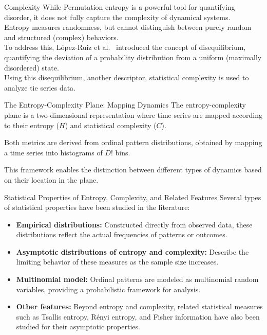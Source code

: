 \documentclass{beamer}
\begin{document}
\begin{frame}{Complexity}
	While Permutation entropy is a powerful tool for quantifying disorder, it does not fully capture the complexity of dynamical systems.\\
	Entropy measures randomness, but cannot distinguish between purely random and structured (complex) behaviors.\\
	To address this, López-Ruiz et al.~\cite{lopez1995statistical} introduced the concept of \alert{disequilibrium}, quantifying the deviation of a probability distribution from a uniform (maximally disordered) state.\\
	Using this disequilibrium, another descriptor, statistical complexity is used to analyze tie series data.  
\end{frame}

\begin{frame}{The Entropy-Complexity Plane: Mapping Dynamics}
	The \alert{entropy-complexity plane} is a two-dimensional representation where time series are mapped according to their entropy ($H$) and statistical complexity ($C$).
	
	Both metrics are derived from ordinal pattern distributions, obtained by mapping a time series into histograms of $D!$ bins.
	
	This framework enables the distinction between different types of dynamics based on their location in the plane.
\end{frame}

\begin{frame}{Statistical Properties of Entropy, Complexity, and Related Features}
	Several types of statistical properties have been studied in the literature:
	\begin{itemize}
		\item \textbf{Empirical distributions:} Constructed directly from observed data, these distributions reflect the actual frequencies of patterns or outcomes.
		\item \textbf{Asymptotic distributions of entropy and complexity:} Describe the limiting behavior of these measures as the sample size increases.
		\item \textbf{Multinomial model:} Ordinal patterns are modeled as multinomial random variables, providing a probabilistic framework for analysis.
		\item \textbf{Other features:} Beyond entropy and complexity, related statistical measures such as Tsallis entropy, Rényi entropy, and Fisher information have also been studied for their asymptotic properties.
	\end{itemize}
\end{frame}
\end{document}
